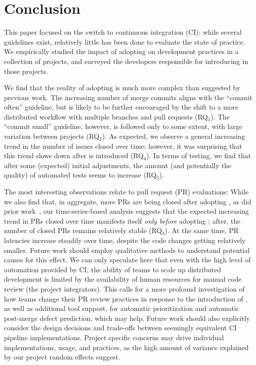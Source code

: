 
\section{Conclusion}
\label{sec:conc}

This paper focused on the switch to continuous integration (CI): while several 
guidelines exist, relatively little has been done to evaluate the state of practice.
We empirically studied the impact of adopting \Tvis on development practices 
in a collection of \GH projects, and surveyed the developers responsible for 
introducing \Tvi in those projects.


We find that the reality of adopting \Tvis is much more complex than suggested 
by previous work.
The increasing number of merge commits aligns with the ``commit often'' 
guideline, but is likely to be further encouraged by the shift to a more distributed 
workflow with multiple branches and pull requests (RQ$_1$).
The ``commit small'' guideline, however, is followed only to some extent, with
large variation between projects (RQ$_2$).
As expected, we observe a general increasing trend in the number of issues
closed over time; however, it was surprising that this trend slows down after \Tvis 
is introduced (RQ$_4$).
In terms of testing, we find that after some (expected) initial adjustments, the amount 
(and potentially the quality) of automated tests seems to increase (RQ$_5$). 

The most interesting observations relate to pull request (PR) evaluations: 
While we also find that, in aggregate, more PRs are being closed after adopting 
\Tvi, as did prior work~\cite{VasilescuYWDF15}, our time-series-based analysis 
suggests that the expected increasing trend in PRs closed over 
time manifests itself \emph{only before} adopting \Tvi; after, the 
number of closed PRs remains relatively stable (RQ$_3$).
At the same time, PR latencies increase steadily over time,
despite the code changes getting relatively smaller.
Future work should employ qualitative methods to understand potential causes
for this effect.
We can only speculate here that even with the high level of automation provided
by CI, the ability of teams to scale up distributed development is limited by the
availability of human resources for manual code review (\ie the project integrators).
This calls for a more profound investigation of how \GH teams change their PR 
review practices in response to the introduction of \Tvis, as well as additional tool 
support, \eg for automatic prioritization and automatic post-merge defect prediction,
which may help. 
Future work should also explicitly consider the design decisions and trade-offs 
between seemingly equivalent CI pipeline implementations.
Project specific concerns may drive individual implementations, usage, and practices,
as the high amount of variance explained by our project random effects suggest.

